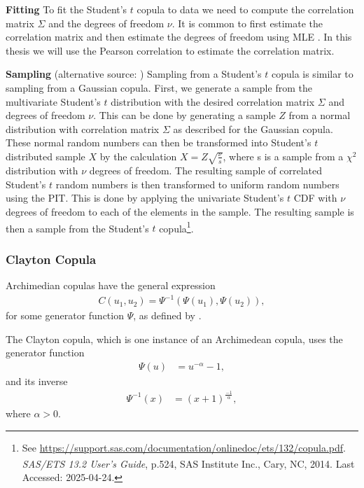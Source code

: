 \textbf{Fitting} 
To fit the Student's $t$ copula to data we need to compute the correlation matrix $\Sigma$ and the degrees of freedom $\nu$. It is common to first estimate the correlation matrix and then estimate the degrees of freedom using \gls{MLE} . In this thesis we will use the Pearson correlation to estimate the correlation matrix. 

\textbf{Sampling} (alternative source: )
Sampling from a Student's $t$ copula is similar to sampling from a Gaussian copula. First, we generate a sample from the multivariate Student's $t$ distribution with the desired correlation matrix $\Sigma$ and degrees of freedom $\nu$. This can be done by generating a sample $Z$ from a normal distribution with correlation matrix $\Sigma$ as described for the Gaussian copula. These normal random numbers can then be transformed into Student's $t$ distributed sample $X$ by the calculation $X = Z\sqrt{\frac{\nu}{s}} $, where s is a sample from a $\chi^2$ distribution with $\nu$ degrees of freedom. The resulting sample of correlated Student's $t$ random numbers is then transformed to uniform random numbers using the \gls{PIT}. This is done by applying the univariate Student's $t$ \gls{CDF} with $\nu$ degrees of freedom to each of the elements in the sample. The resulting sample is then a sample from the Student's $t$ copula\footnote{See \url{https://support.sas.com/documentation/onlinedoc/ets/132/copula.pdf}. \textit{SAS/ETS\textsuperscript{\textregistered} 13.2 User's Guide}, p.524, SAS Institute Inc., Cary, NC, 2014. Last Accessed: 2025-04-24.}.%

\subsubsection{Clayton Copula}\label{sec:ClaytonCopula}
Archimedian copulas have the general expression  
\begin{align*}
    C(u_1,u_2) = \Psi^{-1}(\Psi(u_1),\Psi(u_2)),
\end{align*}
for some generator function $\Psi$, as defined by .

The Clayton copula, which is one instance of an Archimedean copula, uses the generator function
\begin{align*}
    \Psi(u) &=u^{-\alpha}-1, 
\end{align*}
and its inverse
\begin{align*}
    \Psi^{-1}(x) &= (x+1)^{\frac{-1}{\alpha}},
\end{align*}
where $\alpha > 0$. 

